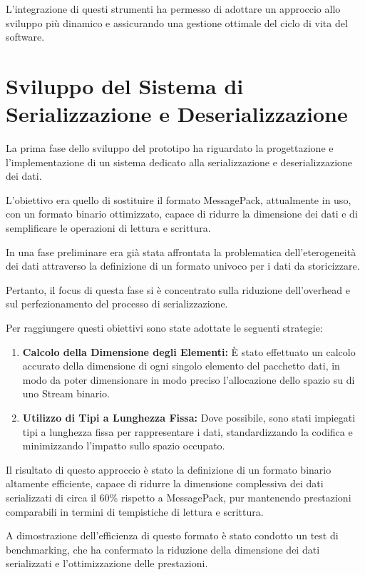 \documentclass[12pt,a4paper,openright,twoside]{book}
\begin{document}
            L'integrazione di questi strumenti ha permesso di adottare un approccio allo sviluppo più dinamico e assicurando una gestione ottimale del ciclo di vita del software.

        \section{Sviluppo del Sistema di Serializzazione e Deserializzazione}

            La prima fase dello sviluppo del prototipo ha riguardato la progettazione e l’implementazione di un sistema dedicato alla serializzazione e deserializzazione dei dati.

            L’obiettivo era quello di sostituire il formato MessagePack, attualmente in uso, con un formato binario ottimizzato, capace di ridurre la dimensione dei dati e di semplificare le operazioni di lettura e scrittura.

            In una fase preliminare era già stata affrontata la problematica dell’eterogeneità dei dati attraverso la definizione di un formato univoco per i dati da storicizzare.

            Pertanto, il focus di questa fase si è concentrato sulla riduzione dell’overhead e sul perfezionamento del processo di serializzazione.

            Per raggiungere questi obiettivi sono state adottate le seguenti strategie:
            \begin{enumerate}
                \item \textbf{Calcolo della Dimensione degli Elementi:} È stato effettuato un calcolo accurato della dimensione di ogni singolo elemento del pacchetto dati, in modo da poter dimensionare in modo preciso l’allocazione dello spazio su di uno Stream binario.
                \item \textbf{Utilizzo di Tipi a Lunghezza Fissa:} Dove possibile, sono stati impiegati tipi a lunghezza fissa per rappresentare i dati, standardizzando la codifica e minimizzando l’impatto sullo spazio occupato.
            \end{enumerate}

            Il risultato di questo approccio è stato la definizione di un formato binario altamente efficiente, capace di ridurre la dimensione complessiva dei dati serializzati di circa il 60\% rispetto a MessagePack, pur mantenendo prestazioni comparabili in termini di tempistiche di lettura e scrittura.

            A dimostrazione dell'efficienza di questo formato è stato condotto un test di benchmarking, che ha confermato la riduzione della dimensione dei dati serializzati e l'ottimizzazione delle prestazioni.
\end{document}
